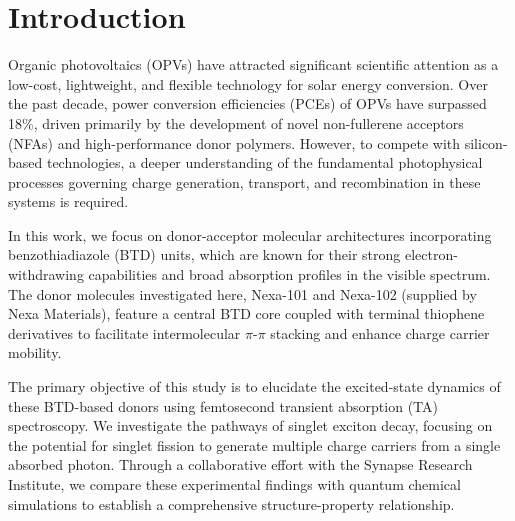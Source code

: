 \section{Introduction}
Organic photovoltaics (OPVs) have attracted significant scientific attention as a low-cost, lightweight, and flexible technology for solar energy conversion. Over the past decade, power conversion efficiencies (PCEs) of OPVs have surpassed 18\%, driven primarily by the development of novel non-fullerene acceptors (NFAs) and high-performance donor polymers.\cite{Vance2025,Adams2024} However, to compete with silicon-based technologies, a deeper understanding of the fundamental photophysical processes governing charge generation, transport, and recombination in these systems is required.

In this work, we focus on donor-acceptor molecular architectures incorporating benzothiadiazole (BTD) units, which are known for their strong electron-withdrawing capabilities and broad absorption profiles in the visible spectrum. The donor molecules investigated here, Nexa-101 and Nexa-102 (supplied by Nexa Materials), feature a central BTD core coupled with terminal thiophene derivatives to facilitate intermolecular $\pi$-$\pi$ stacking and enhance charge carrier mobility. 

The primary objective of this study is to elucidate the excited-state dynamics of these BTD-based donors using femtosecond transient absorption (TA) spectroscopy. We investigate the pathways of singlet exciton decay, focusing on the potential for singlet fission to generate multiple charge carriers from a single absorbed photon. Through a collaborative effort with the Synapse Research Institute, we compare these experimental findings with quantum chemical simulations to establish a comprehensive structure-property relationship.
